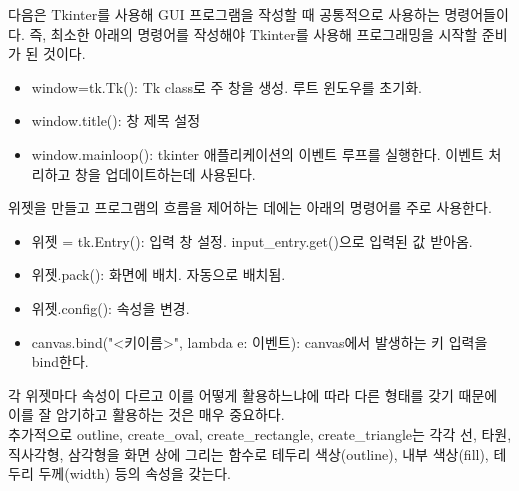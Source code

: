 다음은 Tkinter를 사용해 GUI 프로그램을 작성할 때 공통적으로 사용하는 명령어들이다. 즉, 최소한 아래의 명령어를 작성해야 Tkinter를 사용해 프로그래밍을 시작할 준비가 된 것이다.
\begin{itemize}
\item window=tk.Tk(): Tk class로 주 창을 생성. 루트 윈도우를 초기화.
\item window.title(): 창 제목 설정
\item window.mainloop(): tkinter 애플리케이션의 이벤트 루프를 실행한다. 이벤트 처리하고 창을 업데이트하는데 사용된다.
\end{itemize}

위젯을 만들고 프로그램의 흐름을 제어하는 데에는 아래의 명령어를 주로 사용한다.
\begin{itemize}
\item 위젯 = tk.Entry(): 입력 창 설정. input\_entry.get()으로 입력된 값 받아옴.
\item 위젯.pack(): 화면에 배치. 자동으로 배치됨.
\item 위젯.config(): 속성을 변경.
\item canvas.bind("<키이름>", lambda e: 이벤트): canvas에서 발생하는 키 입력을 bind한다.
\end{itemize}

각 위젯마다 속성이 다르고 이를 어떻게 활용하느냐에 따라 다른 형태를 갖기 때문에 이를 잘 암기하고 활용하는 것은 매우 중요하다.\\
추가적으로 outline, create\_oval, create\_rectangle, create\_triangle는 각각 선, 타원, 직사각형, 삼각형을 화면 상에 그리는 함수로 테두리 색상(outline), 내부 색상(fill), 테두리 두께(width) 등의 속성을 갖는다.
